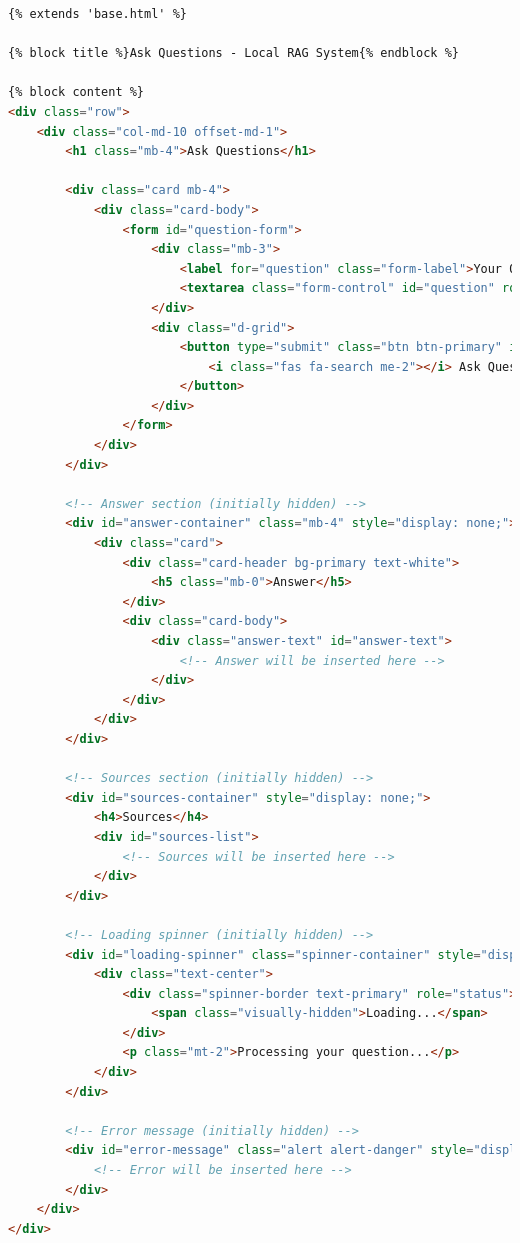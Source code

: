 \documentclass[
  screen,review,acmlarge]{acmart}
\begin{document}
\begin{lstlisting}[language=HTML]
{% extends 'base.html' %}

{% block title %}Ask Questions - Local RAG System{% endblock %}

{% block content %}
<div class="row">
    <div class="col-md-10 offset-md-1">
        <h1 class="mb-4">Ask Questions</h1>
        
        <div class="card mb-4">
            <div class="card-body">
                <form id="question-form">
                    <div class="mb-3">
                        <label for="question" class="form-label">Your Question</label>
                        <textarea class="form-control" id="question" rows="3" placeholder="Enter your question here..." required></textarea>
                    </div>
                    <div class="d-grid">
                        <button type="submit" class="btn btn-primary" id="submit-btn">
                            <i class="fas fa-search me-2"></i> Ask Question
                        </button>
                    </div>
                </form>
            </div>
        </div>
        
        <!-- Answer section (initially hidden) -->
        <div id="answer-container" class="mb-4" style="display: none;">
            <div class="card">
                <div class="card-header bg-primary text-white">
                    <h5 class="mb-0">Answer</h5>
                </div>
                <div class="card-body">
                    <div class="answer-text" id="answer-text">
                        <!-- Answer will be inserted here -->
                    </div>
                </div>
            </div>
        </div>
        
        <!-- Sources section (initially hidden) -->
        <div id="sources-container" style="display: none;">
            <h4>Sources</h4>
            <div id="sources-list">
                <!-- Sources will be inserted here -->
            </div>
        </div>
        
        <!-- Loading spinner (initially hidden) -->
        <div id="loading-spinner" class="spinner-container" style="display: none;">
            <div class="text-center">
                <div class="spinner-border text-primary" role="status">
                    <span class="visually-hidden">Loading...</span>
                </div>
                <p class="mt-2">Processing your question...</p>
            </div>
        </div>
        
        <!-- Error message (initially hidden) -->
        <div id="error-message" class="alert alert-danger" style="display: none;">
            <!-- Error will be inserted here -->
        </div>
    </div>
</div>


\end{lstlisting}
\end{document}
